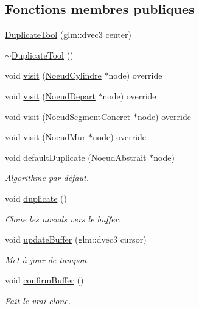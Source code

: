 \subsection*{Fonctions membres publiques}
\begin{DoxyCompactItemize}
\item 
\hyperlink{group__inf2990_ga13dd0524e005f4a44dbaeea9f237d761}{Duplicate\-Tool} (glm\-::dvec3 center)
\item 
\hyperlink{group__inf2990_gaab141bc62b424e5e0bfc48bd899bcb8a}{$\sim$\-Duplicate\-Tool} ()
\item 
void \hyperlink{group__inf2990_gab91de27487440694048c1a0fbcc74da7}{visit} (\hyperlink{class_noeud_cylindre}{Noeud\-Cylindre} $\ast$node) override
\item 
void \hyperlink{group__inf2990_ga5fa8bbf01a90c95062c8104ebdf5bb62}{visit} (\hyperlink{class_noeud_depart}{Noeud\-Depart} $\ast$node) override
\item 
void \hyperlink{group__inf2990_gaa8f5663adbfe6f00a2c2f79083339e30}{visit} (\hyperlink{class_noeud_segment_concret}{Noeud\-Segment\-Concret} $\ast$node) override
\item 
void \hyperlink{group__inf2990_ga9b9e4456490e59603f3d8924fdf19c18}{visit} (\hyperlink{class_noeud_mur}{Noeud\-Mur} $\ast$node) override
\item 
void \hyperlink{group__inf2990_ga4708caab32b10170d24dba25d4829677}{default\-Duplicate} (\hyperlink{class_noeud_abstrait}{Noeud\-Abstrait} $\ast$node)
\begin{DoxyCompactList}\small\item\em Algorithme par défaut. \end{DoxyCompactList}\item 
\hypertarget{group__inf2990_gadbe76417e934ddabc6df18141162fe2c}{void \hyperlink{group__inf2990_gadbe76417e934ddabc6df18141162fe2c}{duplicate} ()}\label{group__inf2990_gadbe76417e934ddabc6df18141162fe2c}

\begin{DoxyCompactList}\small\item\em Clone les noeuds vers le buffer. \end{DoxyCompactList}\item 
void \hyperlink{group__inf2990_ga2fad36673e41afac22177ca37c6c75ff}{update\-Buffer} (glm\-::dvec3 cursor)
\begin{DoxyCompactList}\small\item\em Met à jour de tampon. \end{DoxyCompactList}\item 
void \hyperlink{group__inf2990_ga69fcbb20577c85049ca9a5ca8b37091d}{confirm\-Buffer} ()
\begin{DoxyCompactList}\small\item\em Fait le vrai clone. \end{DoxyCompactList}\end{DoxyCompactItemize}


